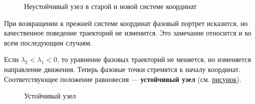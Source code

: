 \documentclass{article}
\begin{document}
\begin{figure}[H]\label{neustuzel}
    \caption{Неустойчивый узел в старой и новой системе координат}
\end{figure}

При возвращении к прежней системе координат фазовый портрет исказится, но качественное поведение траекторий не изменится. Это замечание относится и ко всем последующим случаям.

Если $\lambda_2 < \lambda_1 < 0$, то уравнение фазовых траекторий не меняется, но изменяется направление движения. Теперь фазовые точки стремятся к началу координат. Соответствующее положение равновесия --- \textbf{устойчивый узел} (см. \hyperref[ustuzel]{рисунок}).

\begin{figure}[H]\label{ustuzel}
    \caption{Устойчивый узел}
\end{figure}
\end{document}
